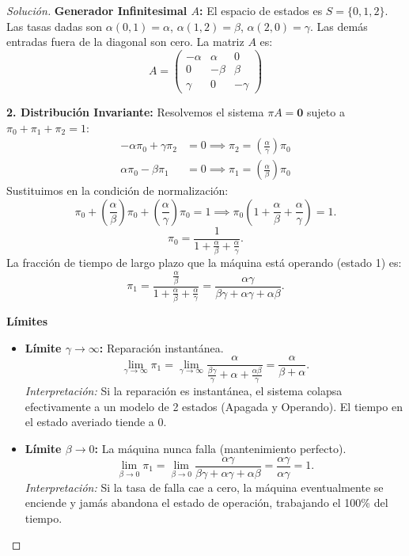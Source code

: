 \documentclass[10pt,a4paper]{article}
\begin{document}
\begin{proof}[Solución]
    \textbf{Generador Infinitesimal $A$:}
    El espacio de estados es $S=\{0, 1, 2\}$. Las tasas dadas son $\alpha(0,1)=\alpha$, $\alpha(1,2)=\beta$, $\alpha(2,0)=\gamma$. Las demás entradas fuera de la diagonal son cero. La matriz $A$ es:
    \[ A = \begin{pmatrix} 
    -\alpha & \alpha & 0 \\ 
    0 & -\beta & \beta \\ 
    \gamma & 0 & -\gamma 
    \end{pmatrix} \]

    \textbf{2. Distribución Invariante:}
    Resolvemos el sistema $\pi A = \mathbf{0}$ sujeto a $\pi_0 + \pi_1 + \pi_2 = 1$:
    \begin{align*}
        -\alpha \pi_0 + \gamma \pi_2 &= 0 \implies \pi_2 = \left(\frac{\alpha}{\gamma}\right) \pi_0 \\
        \alpha \pi_0 - \beta \pi_1 &= 0 \implies \pi_1 = \left(\frac{\alpha}{\beta}\right) \pi_0
    \end{align*}
    Sustituimos en la condición de normalización:
    \[ \pi_0 + \left(\frac{\alpha}{\beta}\right) \pi_0 + \left(\frac{\alpha}{\gamma}\right) \pi_0 = 1 \implies \pi_0 \left( 1 + \frac{\alpha}{\beta} + \frac{\alpha}{\gamma} \right) = 1. \]
    \[ \pi_0 = \frac{1}{1 + \frac{\alpha}{\beta} + \frac{\alpha}{\gamma}}. \]
    La fracción de tiempo de largo plazo que la máquina está operando (estado 1) es:
    \[ \pi_1 = \frac{\frac{\alpha}{\beta}}{1 + \frac{\alpha}{\beta} + \frac{\alpha}{\gamma}} = \frac{\alpha \gamma}{\beta \gamma + \alpha \gamma + \alpha \beta}. \]

    \textbf{Límites }
    \begin{itemize}
        \item \textbf{Límite $\gamma \to \infty$:} Reparación instantánea.
        \[ \lim_{\gamma \to \infty} \pi_1 = \lim_{\gamma \to \infty} \frac{\alpha}{\frac{\beta \gamma}{\gamma} + \alpha + \frac{\alpha \beta}{\gamma}} = \frac{\alpha}{\beta + \alpha}. \]
        \textit{Interpretación:} Si la reparación es instantánea, el sistema colapsa efectivamente a un modelo de 2 estados (Apagada y Operando). El tiempo en el estado averiado tiende a $0$.
        
        \item \textbf{Límite $\beta \to 0$:} La máquina nunca falla (mantenimiento perfecto).
        \[ \lim_{\beta \to 0} \pi_1 = \lim_{\beta \to 0} \frac{\alpha \gamma}{\beta \gamma + \alpha \gamma + \alpha \beta} = \frac{\alpha \gamma}{\alpha \gamma} = 1. \]
        \textit{Interpretación:} Si la tasa de falla cae a cero, la máquina eventualmente se enciende y jamás abandona el estado de operación, trabajando el 100\% del tiempo.
    \end{itemize}
\end{proof}
\end{document}
